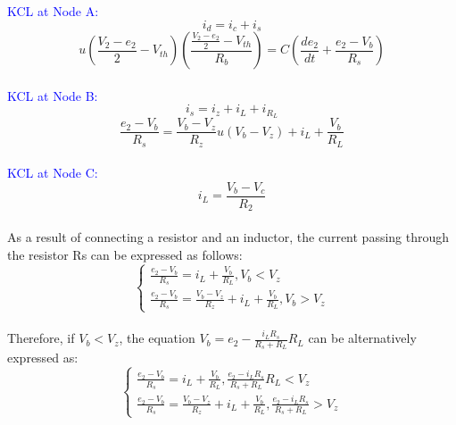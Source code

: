 \textcolor{blue}{KCL at Node A:}\\
\begin{equation}
    i_d=i_c+i_s
\end{equation}
\begin{equation}
    u(\frac{V_2-e_2}{2}-V_{th})(\frac{\frac{V_2-e_2}{2}-V_{th}}{R_b})=C(\frac{de_2}{dt}+\frac{e_2-V_b}{R_s})
\end{equation}\\

\textcolor{blue}{KCL at Node B:}\\
\begin{equation}
    i_s=i_z+i_L+i_{R_L}
\end{equation}
\begin{equation}
    \frac{e_2-V_b}{R_s}=\frac{V_b-V_z}{R_z}u(V_b-V_z)+i_L+\frac{V_b}{R_L}
\end{equation}\\

\textcolor{blue}{KCL at Node C:}\\
\begin{equation}
    i_L=\frac{V_b-V_c}{R_2}
\end{equation}\\

As a result of connecting a resistor and an inductor, the current passing through the resistor Rs can be expressed as follows:\\

\begin{equation}
    \begin{cases}
        \frac{e_2-V_b}{R_s}=i_L+\frac{V_b}{R_L},  V_b<V_z\\
        \frac{e_2-V_b}{R_s}=\frac{V_b-V_z}{R_z}+i_L+\frac{V_b}{R_L},  V_b>V_z
    \end{cases}
\end{equation}\\

Therefore, if $V_b < V_z$, the equation $V_b = e_2 - \frac{i_L R_s}{R_s+R_L} R_L$ can be alternatively expressed as:\\

\begin{equation}
    \begin{cases}
        \frac{e_2-V_b}{R_s}=i_L+\frac{V_b}{R_L},  \frac{e_2-i_LR_s}{R_s+R_L}R_L<V_z\\
        \frac{e_2-V_b}{R_s}=\frac{V_b-V_z}{R_z}+i_L+\frac{V_b}{R_L},  \frac{e_2-i_LR_s}{R_s+R_L}>V_z
    \end{cases}
\end{equation}\\

